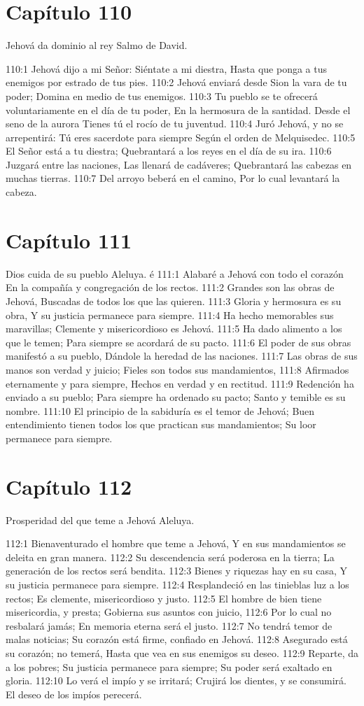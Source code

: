 \section*{Capítulo 110}
Jehová da dominio al rey 
Salmo de David. 
 
110:1 Jehová dijo a mi Señor: 
Siéntate a mi diestra, 
Hasta que ponga a tus enemigos por estrado de tus pies. 
110:2 Jehová enviará desde Sion la vara de tu poder; 
Domina en medio de tus enemigos. 
110:3 Tu pueblo se te ofrecerá voluntariamente en el día de tu poder, 
En la hermosura de la santidad. 
Desde el seno de la aurora 
Tienes tú el rocío de tu juventud. 
110:4 Juró Jehová, y no se arrepentirá: 
Tú eres sacerdote para siempre 
Según el orden de Melquisedec. 
110:5 El Señor está a tu diestra; 
Quebrantará a los reyes en el día de su ira. 
110:6 Juzgará entre las naciones, 
Las llenará de cadáveres; 
Quebrantará las cabezas en muchas tierras. 
110:7 Del arroyo beberá en el camino, 
Por lo cual levantará la cabeza. 
\section*{Capítulo 111}
Dios cuida de su pueblo 
Aleluya. 
é
111:1 Alabaré a Jehová con todo el corazón 
En la compañía y congregación de los rectos. 
111:2 Grandes son las obras de Jehová, 
Buscadas de todos los que las quieren. 
111:3 Gloria y hermosura es su obra, 
Y su justicia permanece para siempre. 
111:4 Ha hecho memorables sus maravillas; 
Clemente y misericordioso es Jehová. 
111:5 Ha dado alimento a los que le temen; 
Para siempre se acordará de su pacto. 
111:6 El poder de sus obras manifestó a su pueblo, 
Dándole la heredad de las naciones. 
111:7 Las obras de sus manos son verdad y juicio; 
Fieles son todos sus mandamientos, 
111:8 Afirmados eternamente y para siempre, 
Hechos en verdad y en rectitud. 
111:9 Redención ha enviado a su pueblo; 
Para siempre ha ordenado su pacto; 
Santo y temible es su nombre. 
111:10 El principio de la sabiduría es el temor de Jehová; 
Buen entendimiento tienen todos los 
que practican sus mandamientos; 
Su loor permanece para siempre. 
\section*{Capítulo 112}
Prosperidad del que teme a Jehová 
Aleluya. 
 
112:1 Bienaventurado el hombre que teme a Jehová, 
Y en sus mandamientos se deleita en gran manera. 
112:2 Su descendencia será poderosa en la tierra; 
La generación de los rectos será bendita. 
112:3 Bienes y riquezas hay en su casa, 
Y su justicia permanece para siempre. 
112:4 Resplandeció en las tinieblas luz a los rectos; 
Es clemente, misericordioso y justo. 
112:5 El hombre de bien tiene misericordia, y presta; 
Gobierna sus asuntos con juicio, 
112:6 Por lo cual no resbalará jamás; 
En memoria eterna será el justo. 
112:7 No tendrá temor de malas noticias; 
Su corazón está firme, confiado en Jehová. 
112:8 Asegurado está su corazón; no temerá, 
Hasta que vea en sus enemigos su deseo. 
112:9 Reparte, da a los pobres; 
Su justicia permanece para siempre; 
Su poder será exaltado en gloria. 
112:10 Lo verá el impío y se irritará; 
Crujirá los dientes, y se consumirá. 
El deseo de los impíos perecerá. 
